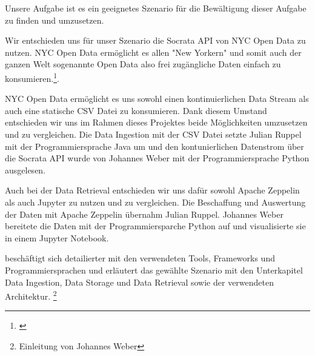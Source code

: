 Unsere Aufgabe ist es ein geeignetes Szenario für die Bewältigung dieser Aufgabe zu finden und umzusetzen.

Wir entschieden uns für unser Szenario die Socrata \ac{API} von NYC Open Data zu nutzen.
NYC Open Data ermöglicht es allen "New Yorkern" und somit auch der ganzen Welt sogenannte Open Data also frei zugängliche Daten
einfach zu konsumieren.\footnote{\cite{NYCOpenData}}.

NYC Open Data ermöglicht es uns sowohl einen kontinuierlichen Data Stream als auch eine statische \ac{CSV} Datei zu konsumieren.
Dank diesem Umstand entschieden wir uns im Rahmen dieses Projektes beide Möglichkeiten umzusetzen und zu vergleichen.
Die Data Ingestion mit der \ac{CSV} Datei setzte Julian Ruppel mit der Programmiersprache Java um und
den kontunierlichen Datenstrom über die Socrata \ac{API} wurde von Johannes Weber mit der Programmiersprache Python
ausgelesen.

Auch bei der Data Retrieval entschieden wir uns dafür sowohl Apache Zeppelin als auch Jupyter zu nutzen und zu vergleichen.
Die Beschaffung und Auswertung der Daten mit Apache Zeppelin übernahm Julian Ruppel.
Johannes Weber bereitete die Daten mit der Programmiersparche Python auf und visualisierte sie in einem Jupyter Notebook.

 beschäftigt sich detailierter mit den verwendeten Tools, Frameworks und Programmiersprachen und 
erläutert das gewählte Szenario mit den Unterkapitel Data Ingestion, Data Storage und Data Retrieval sowie der verwendeten Architektur. \footnote{Einleitung von Johannes Weber}
